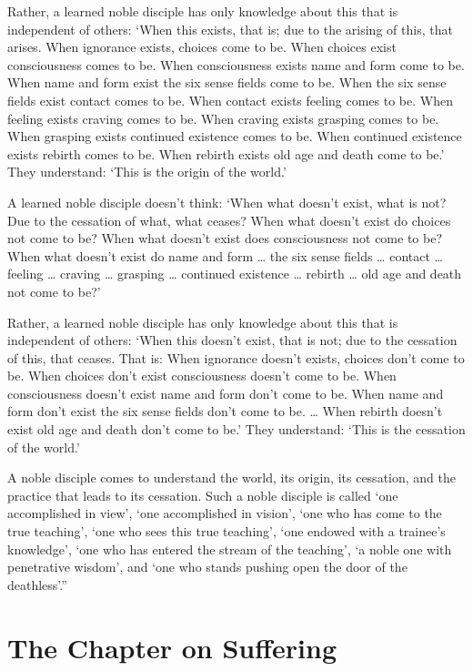 \documentclass[12pt,openany]{book}%
\let\oldcontentsline\contentsline
\newcommand{\nopagecontentsline}[3]{\oldcontentsline{#1}{#2}{}}
\newcommand*{\tocchapterline}[1]{\bfseries\itshape{#1}}
\begin{document}
Rather, a learned noble disciple has only knowledge about this that is independent of others: ‘When this exists, that is; due to the arising of this, that arises. When ignorance exists, choices come to be. When choices exist consciousness comes to be. When consciousness exists name and form come to be. When name and form exist the six sense fields come to be. When the six sense fields exist contact comes to be. When contact exists feeling comes to be. When feeling exists craving comes to be. When craving exists grasping comes to be. When grasping exists continued existence comes to be. When continued existence exists rebirth comes to be. When rebirth exists old age and death come to be.’ They understand: ‘This is the origin of the world.’ 

A learned noble disciple doesn’t think: ‘When what doesn’t exist, what is not? Due to the cessation of what, what ceases? When what doesn’t exist do choices not come to be? When what doesn’t exist does consciousness not come to be? When what doesn’t exist do name and form … the six sense fields … contact … feeling … craving … grasping … continued existence … rebirth … old age and death not come to be?’ 

Rather, a learned noble disciple has only knowledge about this that is independent of others: ‘When this doesn’t exist, that is not; due to the cessation of this, that ceases. That is: When ignorance doesn’t exists, choices don’t come to be. When choices don’t exist consciousness doesn’t come to be. When consciousness doesn’t exist name and form don’t come to be. When name and form don’t exist the six sense fields don’t come to be. … When rebirth doesn’t exist old age and death don’t come to be.’ They understand: ‘This is the cessation of the world.’ 

A noble disciple comes to understand the world, its origin, its cessation, and the practice that leads to its cessation. Such a noble disciple is called ‘one accomplished in view’, ‘one accomplished in vision’, ‘one who has come to the true teaching’, ‘one who sees this true teaching’, ‘one endowed with a trainee’s knowledge’, ‘one who has entered the stream of the teaching’, ‘a noble one with penetrative wisdom’, and ‘one who stands pushing open the door of the deathless’.” 

%
\chapter*{The Chapter on Suffering }
\addcontentsline{toc}{chapter}{\tocchapterline{The Chapter on Suffering }}
\addtocontents{toc}{\let\protect\contentsline\protect\oldcontentsline}
\end{document}
